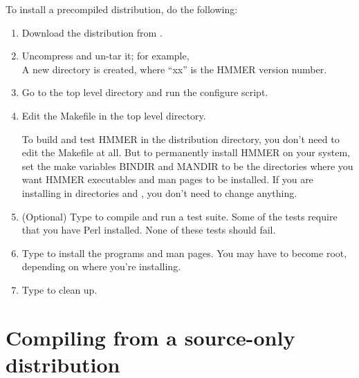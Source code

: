 To install a precompiled distribution, do the following:

\begin{enumerate}
\item Download the distribution from .

\item Uncompress and un-tar it; for example, \\
	A new directory  is created, where ``xx'' is
	the HMMER version number.
\item Go to the top level directory and run the
      configure script.\\
\item Edit the Makefile in the top level directory.

To build and test HMMER in the distribution directory, you don't need
to edit the Makefile at all. But to permanently install HMMER on your
system, set the make variables BINDIR and MANDIR to be the directories
where you want HMMER executables and man pages to be installed. If you
are installing in directories  and
,
you don't need to change anything.

\item (Optional) Type  to compile and run a test suite.
Some of the tests require that you have Perl installed. None of these
tests should fail.

\item Type  to install the programs and man pages. 
You may have to become root, depending on where you're installing.

\item Type  to clean up.
\end{enumerate}

\section{Compiling from a source-only distribution}


